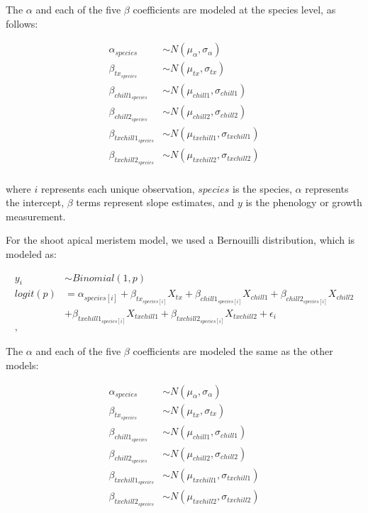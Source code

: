 \documentclass{article}\usepackage[]{graphicx}\usepackage[]{color}
\begin{document}
The $\alpha$ and each of the five $\beta$ coefficients are modeled at the species level, as follows:

\begin{align*}
\alpha_{species} & \sim N(\mu_{\alpha}, \sigma_{\alpha}) \\
\beta_{tx_{species}} & \sim N(\mu_{tx}, \sigma_{tx}) \\
\beta_{chill1_{species}} & \sim N(\mu_{chill1}, \sigma_{chill1}) \\
\beta_{chill2_{species}} & \sim N(\mu_{chill2}, \sigma_{chill2}) \\
\beta_{txchill1_{species}} & \sim N(\mu_{txchill1}, \sigma_{txchill1}) \\
\beta_{txchill2_{species}} & \sim N(\mu_{txchill2}, \sigma_{txchill2}) \\
\end{align*}

where $i$ represents each unique observation, $species$ is the species, $\alpha$ represents the intercept, $\beta$ terms represent slope estimates, and $y$ is the phenology or growth measurement. 

For the shoot apical meristem model, we used a Bernouilli distribution, which is modeled as:

\begin{align*}
 y_i & \sim Binomial(1,p) \tag{2} \\
logit(p) &= \alpha_{species[i]} + \beta_{tx_{species[i]}}X_{tx} + \beta_{chill1_{species[i]}}X_{chill1} + \beta_{chill2_{species[i]}}X_{chill2}\\
&+ \beta_{txchill1_{species[i]}}X_{txchill1} + \beta_{txchill2_{species[i]}}X_{txchill2} + \epsilon_i \nonumber\\,
\end{align*}

The $\alpha$ and each of the five $\beta$ coefficients are modeled the same as the other models:

\begin{align*}
\alpha_{species} & \sim N(\mu_{\alpha}, \sigma_{\alpha}) \\
\beta_{tx_{species}} & \sim N(\mu_{tx}, \sigma_{tx}) \\
\beta_{chill1_{species}} & \sim N(\mu_{chill1}, \sigma_{chill1}) \\
\beta_{chill2_{species}} & \sim N(\mu_{chill2}, \sigma_{chill2}) \\
\beta_{txchill1_{species}} & \sim N(\mu_{txchill1}, \sigma_{txchill1}) \\
\beta_{txchill2_{species}} & \sim N(\mu_{txchill2}, \sigma_{txchill2}) \\
\end{align*}
\end{document}
